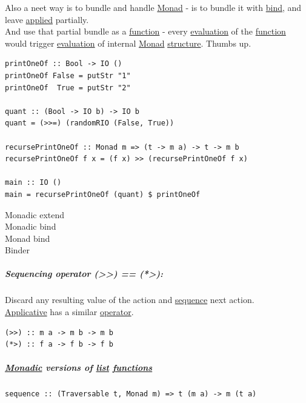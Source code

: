 \documentclass[a4paper,14pt,oneside]{book}
\begin{document}
Also a neet way is to bundle and handle \hyperref[org026d995]{Monad} - is to bundle it with \hyperref[org951e949]{bind}, and leave \hyperref[orgae39546]{applied} partially.\\
And use that partial bundle as a \hyperref[org062ed2a]{function} - every \hyperref[orgc97443b]{evaluation} of the \hyperref[org062ed2a]{function} would trigger \hyperref[orgc97443b]{evaluation} of internal \hyperref[org026d995]{Monad} \hyperref[orgcb71b60]{structure}. Thumbs up.\\
\begin{verbatim}
printOneOf :: Bool -> IO ()
printOneOf False = putStr "1"
printOneOf  True = putStr "2"

quant :: (Bool -> IO b) -> IO b
quant = (>>=) (randomRIO (False, True))

recursePrintOneOf :: Monad m => (t -> m a) -> t -> m b
recursePrintOneOf f x = (f x) >> (recursePrintOneOf f x)

main :: IO ()
main = recursePrintOneOf (quant) $ printOneOf
\end{verbatim}

\subsubparagraph{\emph{*}}
\label{sec:org953322a}

\label{orgf8e9174}Monadic extend\\
\label{org552d691}Monadic bind\\
\label{org45b7b4b}Monad bind\\
\label{org004d26a}Binder\\

\subsubsubparagraph{(>>=)}
\label{sec:orgc2dc7d5}

\subsubsubparagraph{>>=}
\label{sec:org3511581}

\subsubsubparagraph{(=<<)}
\label{sec:org792c10f}

\subsubsubparagraph{=<<}
\label{sec:org6f9fcb2}

\subparagraph{\label{orgaa9d366}Sequencing operator (>>) == (*>):}
\label{sec:orgf1f3b4e}
Discard any resulting value of the action and \hyperref[orgd70bd96]{sequence} next action.\\
\hyperref[org43119e2]{Applicative} has a similar \hyperref[org18d6d76]{operator}.\\
\begin{verbatim}
(>>) :: m a -> m b -> m b
(*>) :: f a -> f b -> f b
\end{verbatim}

\subparagraph{\hyperref[orgd6d7654]{Monadic} versions of \hyperref[org496348e]{list} \hyperref[org69a4fa1]{functions}}
\label{sec:orge5faa90}
\begin{verbatim}
sequence :: (Traversable t, Monad m) => t (m a) -> m (t a)
\end{verbatim}
\end{document}
